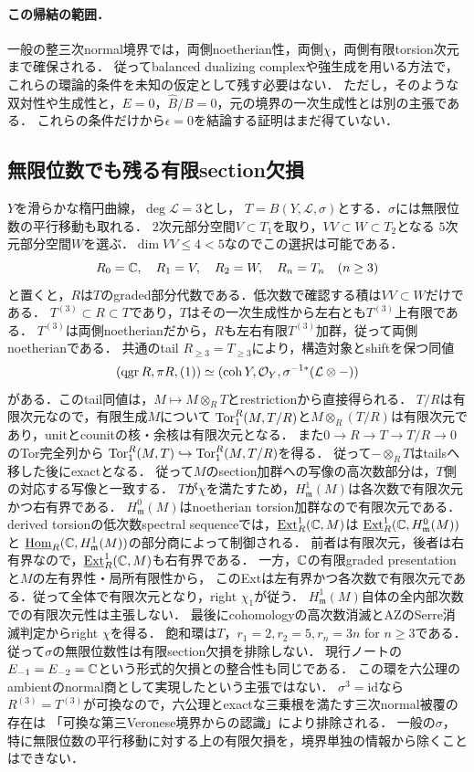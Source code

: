\documentclass[11pt,a4paper]{ltjsarticle}
\begin{document}
\paragraph{この帰結の範囲．}
一般の整三次normal境界では，両側noetherian性，両側$\chi$，両側有限torsion次元まで確保される．
従ってbalanced dualizing complexや強生成を用いる方法で，これらの環論的条件を未知の仮定として残す必要はない．
ただし，そのような双対性や生成性と，$E=0$，$\widehat B/B=0$，元の境界の一次生成性とは別の主張である．
これらの条件だけから$\epsilon=0$を結論する証明はまだ得ていない．


\subsection{無限位数でも残る有限section欠損}
\label{subsec:v10-infinite-defect}

$Y$を滑らかな楕円曲線，$\deg\mathcal L=3$とし，
$T=B(Y,\mathcal L,\sigma)$とする．$\sigma$には無限位数の平行移動も取れる．
$2$次元部分空間$V\subset T_1$を取り，$VV\subset W\subset T_2$となる
$5$次元部分空間$W$を選ぶ．$\dim VV\leq4<5$なのでこの選択は可能である．
\[
 R_0=\mathbb C,\quad R_1=V,\quad R_2=W,\quad R_n=T_n\quad(n\geq3)
\]
と置くと，$R$は$T$のgraded部分代数である．低次数で確認する積は$VV\subset W$だけである．
$T^{(3)}\subset R\subset T$であり，$T$はその一次生成性から左右とも$T^{(3)}$上有限である．
$T^{(3)}$は両側noetherianだから，$R$も左右有限$T^{(3)}$加群，従って両側noetherianである．
共通のtail $R_{\geq3}=T_{\geq3}$により，構造対象とshiftを保つ同値
\[
 (\operatorname{qgr} R,\pi R,(1))\simeq(\operatorname{coh} Y,\mathcal O_Y,\sigma^{-1*}(\mathcal L\otimes-))
\]
がある．このtail同値は，$M\mapsto M\otimes_R T$とrestrictionから直接得られる．
$T/R$は有限次元なので，有限生成$M$について
$\operatorname{Tor}^R_1(M,T/R)$と$M\otimes_R(T/R)$は有限次元であり，unitとcounitの核・余核は有限次元となる．
また$0\to R\to T\to T/R\to0$のTor完全列から
$\operatorname{Tor}^R_1(M,T)\hookrightarrow\operatorname{Tor}^R_1(M,T/R)$を得る．
従って$-\otimes_R T$はtailsへ移した後にexactとなる．
従って$M$のsection加群への写像の高次数部分は，$T$側の対応する写像と一致する．
$T$が$\chi$を満たすため，$H^1_{\mathfrak m}(M)$は各次数で有限次元かつ右有界である．
$H^0_{\mathfrak m}(M)$はnoetherian torsion加群なので有限次元である．
derived torsionの低次数spectral sequenceでは，$\underline{\operatorname{Ext}}^1_R(\mathbb C,M)$は
$\underline{\operatorname{Ext}}^1_R(\mathbb C,H^0_{\mathfrak m}(M))$と
$\underline{\operatorname{Hom}}_R(\mathbb C,H^1_{\mathfrak m}(M))$の部分商によって制御される．
前者は有限次元，後者は右有界なので，$\underline{\operatorname{Ext}}^1_R(\mathbb C,M)$も右有界である．
一方，$\mathbb C$の有限graded presentationと$M$の左有界性・局所有限性から，
このExtは左有界かつ各次数で有限次元である．従って全体で有限次元となり，right $\chi_1$が従う．
$H^1_{\mathfrak m}(M)$自体の全内部次数での有限次元性は主張しない．
最後にcohomologyの高次数消滅とAZのSerre消滅判定からright $\chi$を得る．
飽和環は$T$，$r_1=2,r_2=5,r_n=3n$ for $n\geq3$である．
従って$\sigma$の無限位数性は有限section欠損を排除しない．
現行ノートの$E_{-1}=E_{-2}=\mathbb C$という形式的欠損との整合性も同じである．
この環を六公理のambientのnormal商として実現したという主張ではない．
$\sigma^3=\mathrm{id}$なら$R^{(3)}=T^{(3)}$が可換なので，六公理とexactな三乗根を満たす三次normal被覆の存在は
「可換な第三Veronese境界からの認識」により排除される．
一般の$\sigma$，特に無限位数の平行移動に対する上の有限欠損を，境界単独の情報から除くことはできない．
\end{document}
